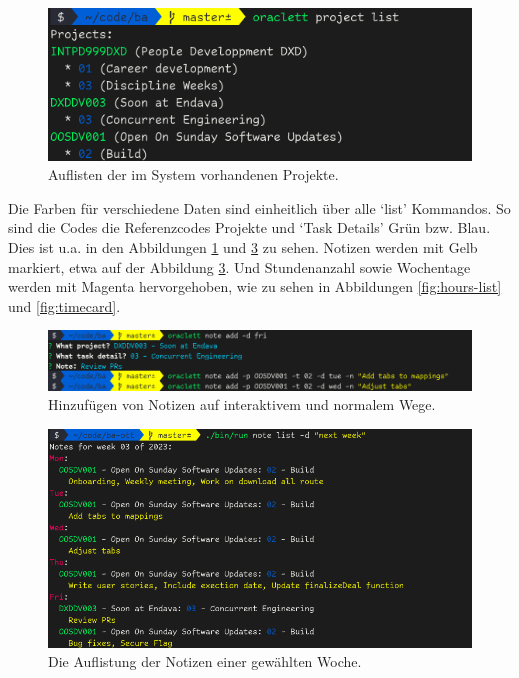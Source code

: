 \documentclass[oneside,bibliography=totocnumbered,BCOR=5mm]{scrbook}
\begin{document}
\begin{figure}
  \centering
  \includegraphics[scale=0.5]{project-list.png}
  \caption{Auflisten der im System vorhandenen Projekte.}
  \label{fig:project-list}
\end{figure}

Die Farben für verschiedene Daten sind einheitlich über alle `list' Kommandos.
So sind die Codes die Referenzcodes Projekte und `Task Details' Grün
bzw. Blau. Dies ist u.a. in den Abbildungen \ref{fig:project-list} und
\ref{fig:note-list} zu sehen. Notizen werden mit Gelb markiert, etwa auf der
Abbildung \ref{fig:note-list}. Und Stundenanzahl sowie Wochentage werden mit
Magenta hervorgehoben, wie zu sehen in Abbildungen \ref{fig:hours-list} und
\ref{fig:timecard}.

\begin{figure}
  \centering
  \includegraphics[scale=0.5]{note-add.png}
  \caption{Hinzufügen von Notizen auf interaktivem und normalem Wege.}
  \label{fig:note-add}
\end{figure}

\begin{figure}
  \centering
  \includegraphics[scale=0.5]{note-list.png}
  \caption{Die Auflistung der Notizen einer gewählten Woche.}
  \label{fig:note-list}
\end{figure}
\end{document}
